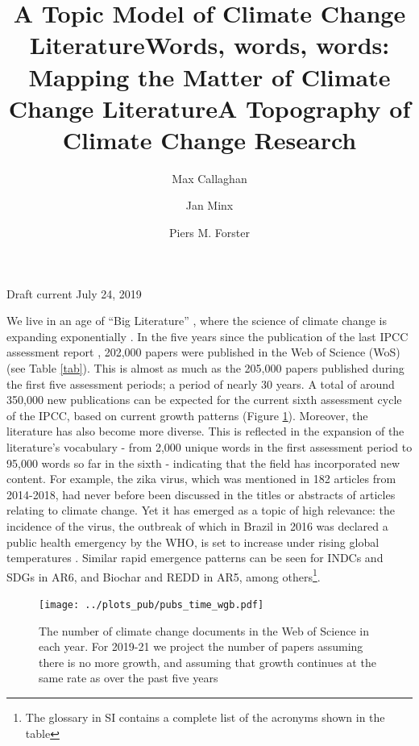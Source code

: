 \documentclass{article}
\title{A Topic Model of Climate Change Literature}
\title{Words, words, words: Mapping the Matter of Climate Change Literature}
\title{A Topography of Climate Change Research}
\author[1,2]{Max Callaghan}
\author[1,2]{Jan Minx}
\author[2]{Piers M. Forster}
\affil[1]{Mercator Research Institute on Global Commons and Climate Change, Torgauer Straße, 10829 Berlin, Germany}
\affil[2]{Priestley International Centre for Climate, University of Leeds, Leeds LS2 9JT, United Kingdom}
\makeatletter
\renewcommand{\maketitle}{\bgroup\setlength{\parindent}{0pt}
	\begin{flushleft}
		
		{\huge\textbf{\@title}}
		
		\bigskip
		
		{\large\textbf{\@author}}
		
		\bigskip
		
		{\large{Draft current July 24, 2019}}
		
	\end{flushleft}\egroup
}
\makeatother
\begin{document}
	\maketitle
	
	
	\begin{linenumbers}
		
		\noindent\textbf{}
		
		
		
		\bigskip
		
		\noindent We live in an age of ``Big Literature'' 
		\cite{Nunez-Mir2016, Minx2017l}, where the science of climate change is expanding exponentially \cite{Grieneisen2011, Haunschild2016}. In the five years since the publication of the last IPCC assessment report \cite{IPCC2014c}, 202,000 papers were published in the Web of Science (WoS) (see Table \ref{tab}). This is almost as much as the 205,000 papers published during the first five assessment periods; a period of nearly 30 years. A total of around 350,000 new publications can be expected for the current sixth assessment cycle of the IPCC, based on current growth patterns (Figure \ref{pub-growth}). Moreover, the literature has also become more diverse. This is reflected in the expansion of the literature's vocabulary - from 2,000 unique words in the first assessment period to 95,000 words so far in the sixth - indicating that the field has incorporated new content. For example, the zika virus, which was mentioned in 182 articles from 2014-2018, had never before been discussed in the titles or abstracts of articles relating to climate change. Yet it has emerged as a topic of high relevance: the incidence of the virus, the outbreak of which in Brazil in 2016 was declared a public health emergency by the WHO, is set to increase under rising global temperatures \cite{Rao2019}. Similar rapid emergence patterns can be seen for INDCs and SDGs in AR6, and Biochar and REDD in AR5, among others\footnote{The glossary in SI contains a complete list of the acronyms shown in the table}.
		
		\begin{figure}[htp]
			\begin{center}
				\texttt{[image: ../plots\_pub/pubs\_time\_wgb.pdf]}
				\caption{ The number of climate change documents in the Web of Science in each year. For 2019-21 we project the number of papers assuming there is no more growth, and assuming that growth continues at the same rate as over the past five years}
				\label{pub-growth}
			\end{center}
		\end{figure}
		

\end{linenumbers}
\end{document}
